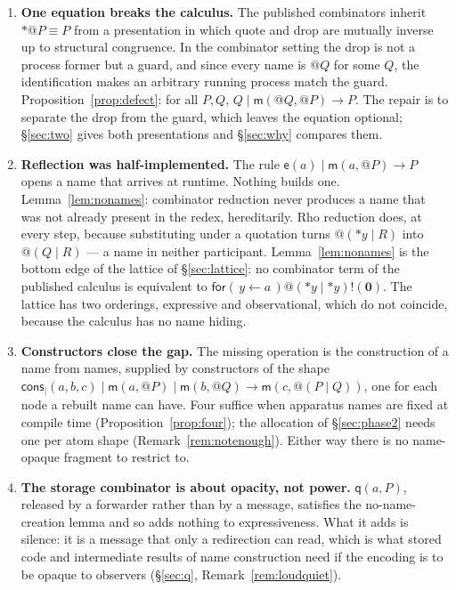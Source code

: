 \documentclass[11pt]{article}
\makeatletter
\theoremstyle{plain}
\theoremstyle{definition}
\theoremstyle{remark}
\newcommand{\quo}[1]{@#1}
\newcommand{\drp}[1]{{*}#1}
\newcommand{\inp}[3]{\mathsf{for}(\,#1 \leftarrow #2\,)#3}
\newcommand{\out}[2]{#1!(#2)}
\newcommand{\nil}{\mathbf{0}}
\newcommand{\mm}{\mathsf{m}}
\newcommand{\ev}{\mathsf{e}}
\newcommand{\qq}{\mathsf{q}}
\newcommand{\cons}{\mathsf{cons}}
\newcommand{\red}{\longrightarrow}
\newcommand{\scong}{\equiv}
\makeatother
\begin{document}
\begin{enumerate}[leftmargin=1.6em]

\item \textbf{One equation breaks the calculus.} The published combinators
inherit $\drp{\quo{P}} \scong P$ from a presentation in which quote and drop
are mutually inverse up to structural congruence. In the combinator setting
the drop is not a process former but a guard, and since every name is
$\quo{Q}$ for some $Q$, the identification makes an arbitrary running process
match the guard. Proposition~\ref{prop:defect}: for all $P,Q$,
$Q \mid \mm(\quo{Q},\quo{P}) \red P$. The repair is to separate the drop from
the guard, which leaves the equation optional;
\S\ref{sec:two} gives both presentations and \S\ref{sec:why} compares
them.

\item \textbf{Reflection was half-implemented.} The rule
$\ev(a) \mid \mm(a,\quo{P}) \red P$ opens a name that arrives at runtime.
Nothing builds one. Lemma~\ref{lem:nonames}: combinator reduction never
produces a name that was not already present in the redex, hereditarily.
Rho reduction does, at every step, because substituting under a quotation
turns $\quo{(\drp{y} \mid R)}$ into $\quo{(Q \mid R)}$ --- a name in neither
participant. Lemma~\ref{lem:nonames} is the bottom edge of the lattice of
\S\ref{sec:lattice}: no combinator term of the published calculus is
equivalent to $\inp{y}{a}{\out{\quo{(\drp{y} \mid \drp{y})}}{\nil}}$. The
lattice has two orderings, expressive and observational, which do not
coincide, because the calculus has no name hiding.

\item \textbf{Constructors close the gap.} The missing operation is the
construction of a name from names, supplied by constructors of the shape
$\cons_{\mid}(a,b,c) \mid \mm(a,\quo{P}) \mid \mm(b,\quo{Q}) \red
\mm(c,\quo{(P \mid Q)})$, one for each node a rebuilt name can have.
Four suffice when apparatus names are fixed at compile time
(Proposition~\ref{prop:four}); the allocation of \S\ref{sec:phase2} needs one
per atom shape (Remark~\ref{rem:notenough}). Either way there is no
name-opaque fragment to restrict to.

\item \textbf{The storage combinator is about opacity, not power.}
$\qq(a,P)$, released by a forwarder rather than by a message, satisfies the
no-name-creation lemma and so adds nothing to expressiveness. What it adds is
silence: it is a message that only a redirection can read, which is what
stored code and intermediate results of name construction need if the
encoding is to be opaque to observers (\S\ref{sec:q},
Remark~\ref{rem:loudquiet}).


\end{enumerate}
\end{document}
